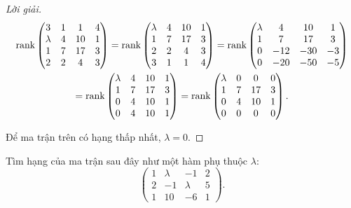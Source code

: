 \documentclass[class=linear-algebra,crop=false]{standalone}
\begin{document}
\begin{proof}[Lời giải]
	\begingroup{}
	\allowdisplaybreaks{}
	\begin{gather*}
		\text{rank}\begin{pmatrix}
			3       & 1 & 1  & 4 \\
			\lambda & 4 & 10 & 1 \\
			1       & 7 & 17 & 3 \\
			2       & 2 & 4  & 3
		\end{pmatrix}
		=\text{rank}\begin{pmatrix}
			\lambda & 4 & 10 & 1 \\
			1       & 7 & 17 & 3 \\
			2       & 2 & 4  & 3 \\
			3       & 1 & 1  & 4 \\
		\end{pmatrix}
		=\text{rank}\begin{pmatrix}
			\lambda & 4   & 10  & 1  \\
			1       & 7   & 17  & 3  \\
			0       & -12 & -30 & -3 \\
			0       & -20 & -50 & -5 \\
		\end{pmatrix} \\
		=\text{rank}\begin{pmatrix}
			\lambda & 4 & 10 & 1 \\
			1       & 7 & 17 & 3 \\
			0       & 4 & 10 & 1 \\
			0       & 4 & 10 & 1 \\
		\end{pmatrix}
		=\text{rank}\begin{pmatrix}
			\lambda & 0 & 0  & 0 \\
			1       & 7 & 17 & 3 \\
			0       & 4 & 10 & 1 \\
			0       & 0 & 0  & 0 \\
		\end{pmatrix}.
	\end{gather*}
	\endgroup{}
	\par Để ma trận trên có hạng thấp nhất, $\lambda = 0$.
\end{proof}

\begin{exercise}
	\par Tìm hạng của ma trận sau đây như một hàm phụ thuộc $\lambda$:
	\[
		\begin{pmatrix}
			1 & \lambda & -1      & 2 \\
			2 & -1      & \lambda & 5 \\
			1 & 10      & -6      & 1
		\end{pmatrix}.
	\]
\end{exercise}
\end{document}
